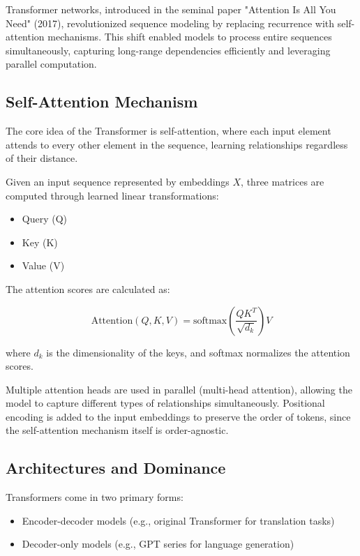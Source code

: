 \documentclass[openany]{book}
\begin{document}
Transformer networks, introduced in the seminal paper 
"Attention Is All You Need" (2017), revolutionized sequence modeling by 
replacing recurrence with self-attention mechanisms. This shift enabled models 
to process entire sequences simultaneously, capturing long-range dependencies 
efficiently and leveraging parallel computation.

\subsection{Self-Attention Mechanism}

The core idea of the Transformer is self-attention, where each input element 
attends to every other element in the sequence, learning relationships 
regardless of their distance.

Given an input sequence represented by embeddings $X$, three matrices are 
computed through learned linear transformations:

\begin{itemize}
    \item Query (Q)
    \item Key (K)
    \item Value (V)
\end{itemize}

The attention scores are calculated as:

\begin{equation}
\text{Attention}(Q, K, V) = \text{softmax}\left(\frac{QK^T}{\sqrt{d_k}}\right)V
\end{equation}

where $d_k$ is the dimensionality of the keys, and softmax normalizes the 
attention scores.

Multiple attention heads are used in parallel (multi-head attention), 
allowing the model to capture different types of relationships simultaneously. 
Positional encoding is added to the input embeddings to preserve the order of 
tokens, since the self-attention mechanism itself is order-agnostic.

\subsection{Architectures and Dominance}

Transformers come in two primary forms:

\begin{itemize}
    \item Encoder-decoder models (e.g., original Transformer for translation 
    tasks)
    \item Decoder-only models (e.g., GPT series for language generation)
\end{itemize}
\end{document}
